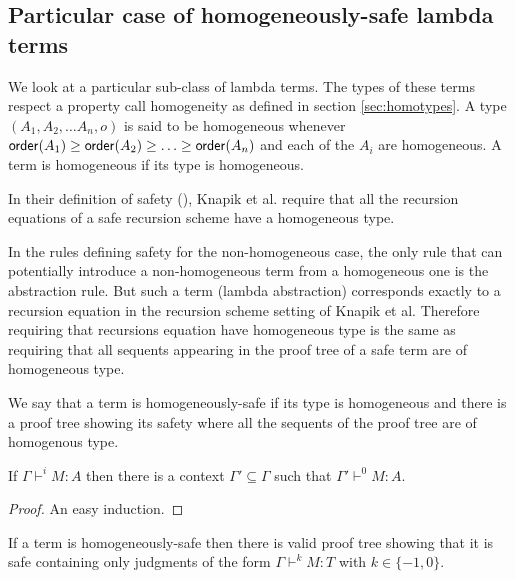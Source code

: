\subsection{Particular case of homogeneously-safe lambda terms}

We look at a particular sub-class of lambda terms. The types of
these terms respect a property call homogeneity as defined in
section \ref{sec:homotypes}. A type $(A_1, A_2, \ldots A_n, o)$ is
said to be homogeneous whenever ${\sf order}(A_1) \geq {\sf order}(A_2) \geq
\ldots \geq  {\sf order}(A_n)$ and each of the $A_i$ are homogeneous. A
term is homogeneous if its type is homogeneous.


In their definition of safety (\cite{KNU02}), Knapik et al. require
that all the recursion equations of a safe recursion scheme have a
homogeneous type.

In the rules defining safety for the non-homogeneous case, the only
rule that can potentially introduce a non-homogeneous term from a
homogeneous one is the abstraction rule. But such a term (lambda
abstraction) corresponds exactly to a recursion equation in the
recursion scheme setting of Knapik et al. Therefore requiring that
recursions equation have homogeneous type is the same as requiring
that all sequents appearing in the proof tree of a safe term are of
homogeneous type.

We say that a term is homogeneously-safe if its type is homogeneous
and there is a proof tree showing its safety where all the sequents
of the proof tree are of homogenous type.

\begin{lem}
\label{lem:context_reduction} If $\Gamma \vdash^i M : A$ then there
is a context $\Gamma' \subseteq \Gamma$ such that $\Gamma' \vdash^0
M : A$.
\end{lem}
\begin{proof}
An easy induction.
\end{proof}


\begin{lem}
\label{lem:homog_judg_zero_minusone} If a term is homogeneously-safe
then there is valid proof tree showing that it is safe containing
only judgments of the form $\Gamma \vdash^{k} M : T$ with $k\in
\{-1,0\}$.
\end{lem}

